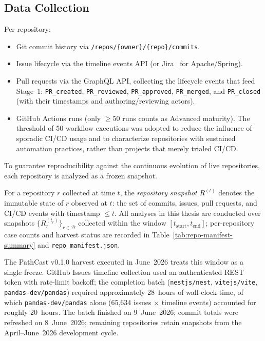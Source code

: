 \subsection{Data Collection}
\label{sec:data-collection}

Per repository:
\begin{itemize}
    \item Git commit history via
    \texttt{/repos/\{owner\}/\{repo\}/commits}.
    \item Issue lifecycle via the timeline events API
    (or Jira~\cite{montgomery2022jira} for Apache/Spring).
    \item Pull requests via the GraphQL API, collecting the lifecycle events
    that feed Stage~1: \texttt{PR\_created}, \texttt{PR\_reviewed},
    \texttt{PR\_approved}, \texttt{PR\_merged}, and \texttt{PR\_closed}
    (with their timestamps and authoring/reviewing actors).
    \item GitHub Actions runs (only $\geq 50$ runs counts as Advanced
    maturity). The threshold of 50 workflow executions was adopted to reduce
    the influence of sporadic CI/CD usage and to characterize repositories
    with sustained automation practices, rather than projects that merely
    trialed CI/CD.
\end{itemize}

To guarantee reproducibility against the continuous evolution of live
repositories, each repository is analyzed as a frozen snapshot.

\begin{definition}
\label{def:repo-snapshot}
For a repository $r$ collected at time $t$, the \emph{repository snapshot}
$R^{(t)}$ denotes the immutable state of $r$ observed at $t$: the set of
commits, issues, pull requests, and CI/CD events with timestamp $\leq t$.
All analyses in this thesis are conducted over snapshots
$\{R_r^{(t_r)}\}_{r \in \mathcal{D}}$ collected within the window
$[t_{\text{start}}, t_{\text{end}}]$; per-repository case counts and harvest
status are recorded in Table~\ref{tab:repo-manifest-summary} and
\texttt{repo\_manifest.json}.
\end{definition}

The PathCast v0.1.0 harvest executed in June~2026 treats this window as a
single freeze. GitHub Issues timeline collection used an authenticated REST
token with rate-limit backoff; the completion batch
(\texttt{nestjs/nest}, \texttt{vitejs/vite}, \texttt{pandas-dev/pandas})
required approximately 28~hours of wall-clock time, of which
\texttt{pandas-dev/pandas} alone (65{,}634 issues $\times$ timeline events)
accounted for roughly 20~hours. The batch finished on 9~June~2026; commit
totals were refreshed on 8~June~2026; remaining repositories retain
snapshots from the April--June~2026 development cycle.

